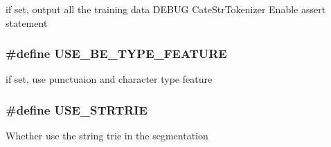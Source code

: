 if set, output all the training data DEBUG CateStrTokenizer Enable assert statement 
\subsubsection[{USE\_\-BE\_\-TYPE\_\-FEATURE}]{\setlength{\rightskip}{0pt plus 5cm}\#define USE\_\-BE\_\-TYPE\_\-FEATURE}\label{cmacconfig_8h_435943505ae5e7a8712d51341bd05808}


if set, use punctuaion and character type feature 
\subsubsection[{USE\_\-STRTRIE}]{\setlength{\rightskip}{0pt plus 5cm}\#define USE\_\-STRTRIE}\label{cmacconfig_8h_fa0bb5c841887bf16853c4e828a8b416}


Whether use the string trie in the segmentation 